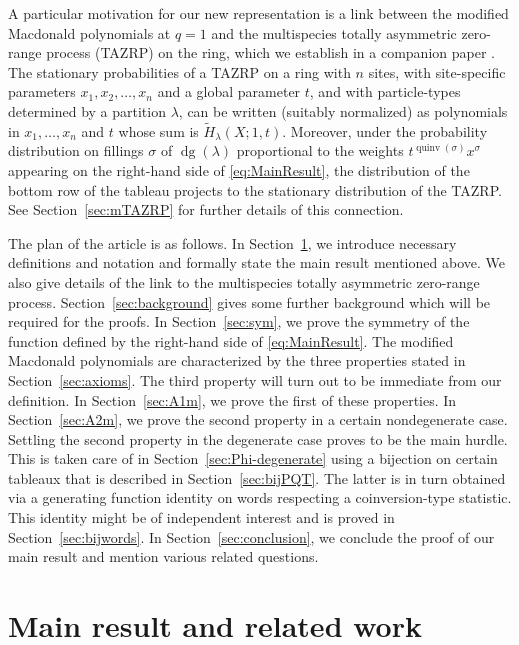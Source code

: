 \documentclass[ALCO,Unicode]{cedram}
\DeclareMathOperator{\dg}{dg}
\DeclareMathOperator{\quinv}{quinv}
\begin{document}
A particular motivation for our new representation is a link between the modified Macdonald polynomials at $q=1$ and the multispecies totally asymmetric zero-range process (TAZRP) on the ring, which we establish in a companion paper \cite{AMM22}. 
The stationary probabilities of a TAZRP on a ring with $n$ sites, with site-specific 
parameters $x_1, x_2, \dots, x_n$ and a global parameter $t$, and with
particle-types determined by a partition $\lambda$, 
can be written (suitably normalized) as polynomials in $x_1,\dots, x_n$ and $t$ whose 
sum is $\widetilde{H}_{\lambda}(X;1,t)$. Moreover, under
the probability distribution on fillings $\sigma$ of $\dg(\lambda)$ 
proportional to the weights $t^{\quinv(\sigma)} x^\sigma$ appearing on the right-hand side
of \eqref{eq:MainResult}, the distribution of the bottom row of the tableau 
projects to the stationary distribution of the TAZRP. 
See Section~\ref{sec:mTAZRP} for further details of this connection. 


The plan of the article is as follows. In Section~\ref{sec:main}, we introduce necessary definitions and notation and formally state the main result mentioned above. We also give details of the link to the multispecies totally asymmetric zero-range process. Section~\ref{sec:background} gives some further background which will be required for the proofs. In Section~\ref{sec:sym}, we prove the symmetry of the function defined by 
the right-hand side of \eqref{eq:MainResult}. The modified Macdonald polynomials are characterized by the three properties stated in Section~\ref{sec:axioms}. The third property will turn out to be immediate from our definition. In Section~\ref{sec:A1m}, we prove the first of these properties. In Section~\ref{sec:A2m}, we prove the second property in a certain nondegenerate case. Settling the second property in the degenerate case proves to be the main hurdle. This is taken care of in Section~\ref{sec:Phi-degenerate} using a bijection on certain tableaux that is described in Section~\ref{sec:bijPQT}. The latter is in turn obtained via a generating function identity on words respecting a coinversion-type statistic. This identity might be of independent interest and is proved in Section~\ref{sec:bijwords}. In Section~\ref{sec:conclusion}, we conclude the proof of our main result and mention various related questions.

\section{Main result and related work}
\label{sec:main}
\end{document}
